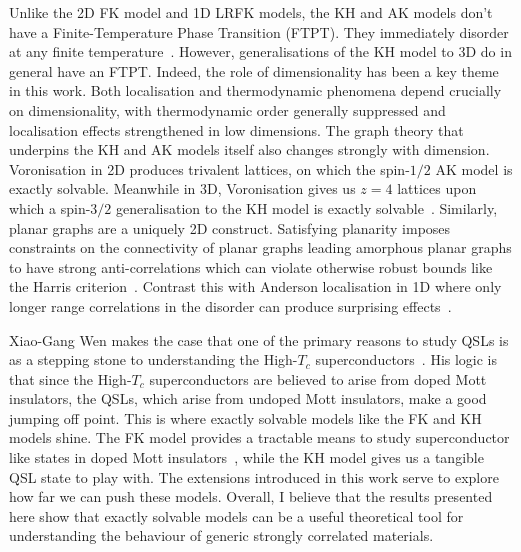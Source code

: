 Unlike the 2D FK model and 1D LRFK models, the KH and AK models don't have a Finite-Temperature Phase Transition (FTPT). They immediately disorder at any finite temperature~\autocite{eschmannThermodynamicClassificationThreedimensional2020}. However, generalisations of the KH model to 3D do in general have an FTPT. Indeed, the role of dimensionality has been a key theme in this work. Both localisation and thermodynamic phenomena depend crucially on dimensionality, with thermodynamic order generally suppressed and localisation effects strengthened in low dimensions. The graph theory that underpins the KH and AK models itself also changes strongly with dimension. Voronisation in 2D produces trivalent lattices, on which the spin-\(1/2\) AK model is exactly solvable. Meanwhile in 3D, Voronisation gives us \(z=4\) lattices upon which a spin-\(3/2\) generalisation to the KH model is exactly solvable~\autocite{yaoAlgebraicSpinLiquid2009,wenQuantumOrderStringnet2003,ryuThreedimensionalTopologicalPhase2009}. Similarly, planar graphs are a uniquely 2D construct. Satisfying planarity imposes constraints on the connectivity of planar graphs leading amorphous planar graphs to have strong anti-correlations which can violate otherwise robust bounds like the Harris criterion~\autocite{harrisEffectRandomDefects1974}. Contrast this with Anderson localisation in 1D where only longer range correlations in the disorder can produce surprising effects~\autocite{aubryAnalyticityBreakingAnderson1980,dassarmaLocalizationMobilityEdges1990,dunlapAbsenceLocalizationRandomdimer1990,izrailevLocalizationMobilityEdge1999,croyAndersonLocalization1D2011,izrailevAnomalousLocalizationLowDimensional2012}.

Xiao-Gang Wen makes the case that one of the primary reasons to study QSLs is as a stepping stone to understanding the High-\(T_c\) superconductors~\autocite{wenQuantumOrdersSymmetric2002}. His logic is that since the High-\(T_c\) superconductors are believed to arise from doped Mott insulators, the QSLs, which arise from undoped Mott insulators, make a good jumping off point. This is where exactly solvable models like the FK and KH models shine. The FK model provides a tractable means to study superconductor like states in doped Mott insulators~\autocite{caiVisualizingEvolutionMott2016}, while the KH model gives us a tangible QSL state to play with. The extensions introduced in this work serve to explore how far we can push these models. Overall, I believe that the results presented here show that exactly solvable models can be a useful theoretical tool for understanding the behaviour of generic strongly correlated materials.
